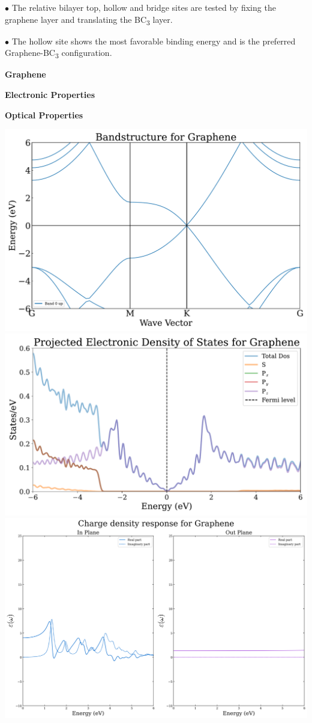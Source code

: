 \documentclass[a0paper,portrait]{baposter}
\begin{document}
\begin{poster}
{\begin{minipage}{1\linewidth}\begin{center}\footnotesize
    \begin{tcolorbox}[colback=table_color_2, colframe=table_color_2, rounded corners, boxsep=2pt, left=0pt, right=0pt, top=0pt, bottom=0pt]
        \par $\bullet$ The relative bilayer top, hollow and bridge sites are tested by fixing the graphene layer and translating the BC\textsubscript{3} layer.
        \par $\bullet$ The hollow site shows the most favorable binding energy and is the preferred Graphene-BC\textsubscript{3} configuration.
    \end{tcolorbox}
\end{center}\end{minipage}

\begin{center}\small\textbf{Graphene}\end{center}

\vspace{-5pt}\begin{minipage}[t]{0.72\linewidth}\begin{center}
    \small\textcolor{dark_blue}{\textbf{Electronic Properties}}
\end{center}\end{minipage}
\begin{minipage}[t]{0.24\linewidth}\begin{center}
    \small\textcolor{dark_blue}{\textbf{Optical Properties}}
\end{center}\end{minipage}

\begin{minipage}[t]{1\linewidth}\begin{center}
    \includegraphics[width=0.30\linewidth]{poster_figures/G_BS.pdf}
    \includegraphics[width=0.30\linewidth]{poster_figures/G_PDOS.pdf}
    \includegraphics[width=0.30\linewidth]{poster_figures/G_opt.pdf}
\end{center}\end{minipage}

}
\end{poster}
\end{document}
